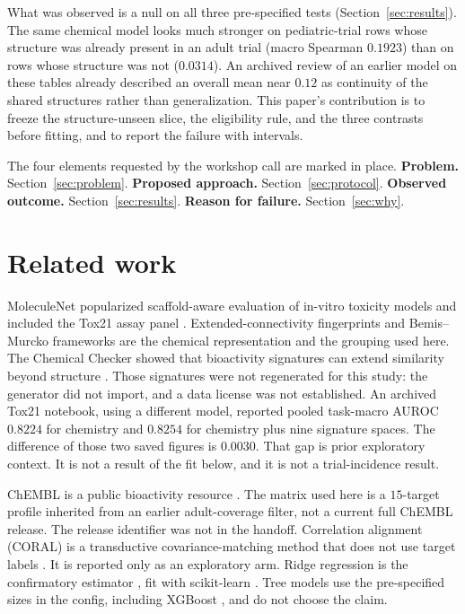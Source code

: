 \documentclass{article}
\begin{document}
What was observed is a null on all three pre-specified tests (Section~\ref{sec:results}).
The same chemical model looks much stronger on pediatric-trial rows whose structure was already present in an adult trial (macro Spearman $0.1923$) than on rows whose structure was not ($0.0314$).
An archived review of an earlier model on these tables already described an overall mean near $0.12$ as continuity of the shared structures rather than generalization.
This paper's contribution is to freeze the structure-unseen slice, the eligibility rule, and the three contrasts before fitting, and to report the failure with intervals.

The four elements requested by the workshop call are marked in place.
\textbf{Problem.} Section~\ref{sec:problem}.
\textbf{Proposed approach.} Section~\ref{sec:protocol}.
\textbf{Observed outcome.} Section~\ref{sec:results}.
\textbf{Reason for failure.} Section~\ref{sec:why}.

\section{Related work}
\label{sec:related}

MoleculeNet popularized scaffold-aware evaluation of in-vitro toxicity models and included the Tox21 assay panel \citep{wu2018moleculenet,tice2013tox21}.
Extended-connectivity fingerprints \citep{rogers2010ecfp} and Bemis--Murcko frameworks \citep{bemis1996frameworks} are the chemical representation and the grouping used here.
The Chemical Checker showed that bioactivity signatures can extend similarity beyond structure \citep{duranfrigola2020chemicalchecker}.
Those signatures were not regenerated for this study: the generator did not import, and a data license was not established.
An archived Tox21 notebook, using a different model, reported pooled task-macro AUROC $0.8224$ for chemistry and $0.8254$ for chemistry plus nine signature spaces.
The difference of those two saved figures is $0.0030$.
That gap is prior exploratory context.
It is not a result of the fit below, and it is not a trial-incidence result.

ChEMBL is a public bioactivity resource \citep{zdrazil2024chembl}.
The matrix used here is a $15$-target profile inherited from an earlier adult-coverage filter, not a current full ChEMBL release.
The release identifier was not in the handoff.
Correlation alignment (CORAL) is a transductive covariance-matching method that does not use target labels \citep{sun2016coral}.
It is reported only as an exploratory arm.
Ridge regression is the confirmatory estimator \citep{hoerl1970ridge}, fit with scikit-learn \citep{pedregosa2011sklearn}.
Tree models use the pre-specified sizes in the config, including XGBoost \citep{chen2016xgboost}, and do not choose the claim.
\end{document}
